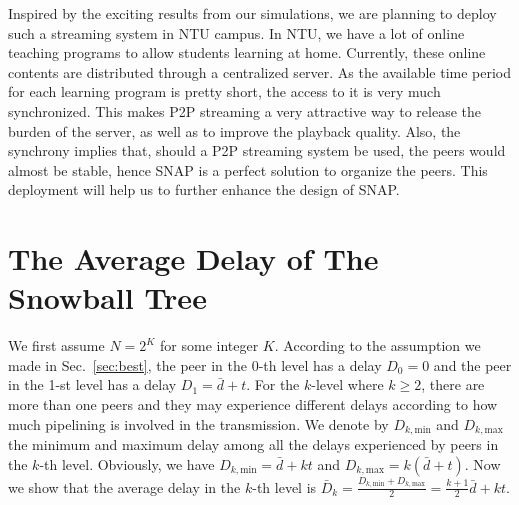 \documentclass[conference]{IEEEtran}
\begin{document}
  Inspired by the exciting results from our simulations, we are planning to deploy such a streaming system in NTU campus. In NTU, we have a lot of online teaching programs to allow students learning at home. Currently, these online contents are distributed through a centralized server. As the available time period for each learning program is pretty short, the access to it is very much synchronized. This makes P2P streaming a very attractive way to release the burden of the server, as well as to improve the playback quality. Also, the synchrony implies that, should a P2P streaming system be used, the peers would almost be stable, hence SNAP is a perfect solution to organize the peers. This deployment will help us to further enhance the design of SNAP.




\appendices
\section{The Average Delay of The Snowball Tree} \label{sec:avg}
We first assume $N=2^K$ for some integer $K$. According to the assumption we made in Sec.~\ref{sec:best}, the peer in the 0-th level has a delay $D_0 = 0$ and the peer in the 1-st level has a delay $D_1 = \bar{d}+t$. For the $k$-level where $k \geq 2$, there are more than one peers and they may experience different delays according to how much pipelining is involved in the transmission. We denote by $D_{k,\mathrm{min}}$ and $D_{k,\mathrm{max}}$ the minimum and maximum delay among all the delays experienced by peers in the $k$-th level. Obviously, we have $D_{k,\mathrm{min}} = \bar{d} + kt$ and $D_{k,\mathrm{max}} = k\left(\bar{d} + t\right)$. Now we show that the average delay in the $k$-th level is
   $\bar{D}_k = \frac{D_{k,\mathrm{min}} + D_{k,\mathrm{max}}}{2} = \frac{k+1}{2}\bar{d} + kt$.
\end{document}
